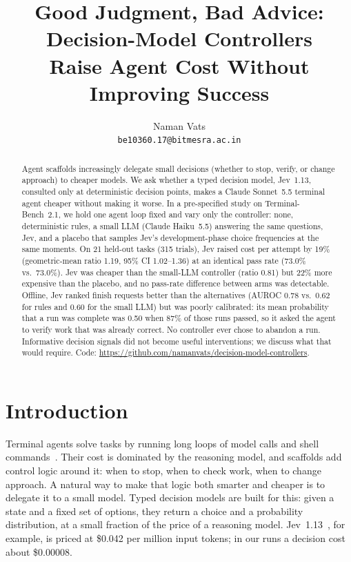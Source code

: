 \documentclass[10pt]{article}
\title{Good Judgment, Bad Advice: Decision-Model Controllers\\Raise Agent Cost Without Improving Success}
\author{Naman Vats\\\texttt{be10360.17@bitmesra.ac.in}}
\date{}
\begin{document}
\maketitle

\begin{abstract}
Agent scaffolds increasingly delegate small decisions (whether to stop, verify, or change approach) to cheaper models.
We ask whether a typed decision model, Jev~1.13, consulted only at deterministic decision points, makes a Claude Sonnet~5.5 terminal agent cheaper without making it worse.
In a pre-specified study on Terminal-Bench~2.1, we hold one agent loop fixed and vary only the controller: none, deterministic rules, a small LLM (Claude Haiku~5.5) answering the same questions, Jev, and a placebo that samples Jev's development-phase choice frequencies at the same moments.
On 21 held-out tasks (315 trials), Jev raised cost per attempt by 19\% (geometric-mean ratio 1.19, 95\% CI 1.02--1.36) at an identical pass rate (73.0\% vs.\ 73.0\%).
Jev was cheaper than the small-LLM controller (ratio 0.81) but 22\% more expensive than the placebo, and no pass-rate difference between arms was detectable.
Offline, Jev ranked finish requests better than the alternatives (AUROC 0.78 vs.\ 0.62 for rules and 0.60 for the small LLM) but was poorly calibrated: its mean probability that a run was complete was 0.50 when 87\% of those runs passed, so it asked the agent to verify work that was already correct.
No controller ever chose to abandon a run.
Informative decision signals did not become useful interventions; we discuss what that would require.
Code: \url{https://github.com/namanvats/decision-model-controllers}.
\end{abstract}

\section{Introduction}

Terminal agents solve tasks by running long loops of model calls and shell commands~\citep{yao2023react,yang2024sweagent}.
Their cost is dominated by the reasoning model, and scaffolds add control logic around it: when to stop, when to check work, when to change approach.
A natural way to make that logic both smarter and cheaper is to delegate it to a small model.
Typed decision models are built for this: given a state and a fixed set of options, they return a choice and a probability distribution, at a small fraction of the price of a reasoning model.
Jev~1.13~\citep{jevdocs}, for example, is priced at \$0.042 per million input tokens; in our runs a decision cost about \$0.00008.
\end{document}
